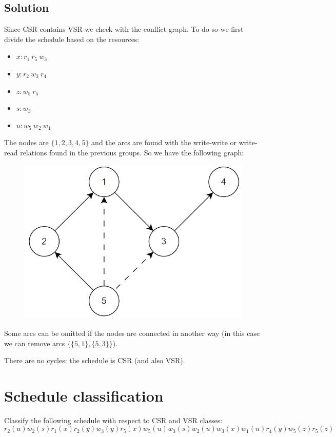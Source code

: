 \documentclass[12pt, a4paper]{report}
\newtheorem[style=M,bodystyle=\normalfont]{theorem}{Theorem}
\newtheorem[style=M,bodystyle=\normalfont]{corollary}{Corollary}
\newtheorem[style=M,bodystyle=\normalfont]{lemma}{Lemma}
\newtheorem[style=M,bodystyle=\normalfont]{definition}{Definition}
\begin{document}
    \subsection*{Solution}
        Since CSR contains VSR we check with the conflict graph. To do so we first divide the schedule based on the resources: 
        \begin{itemize}
            \item $x: r_1 \: r_5 \:w_3$
            \item $y: r_2 \: w_3 \:r_4$
            \item $z: w_5 \: r_5$
            \item $s: w_3$
            \item $u: w_5 \: w_2 \:w_1$
        \end{itemize}
        The nodes are $\{1,2,3,4,5\}$ and the arcs are found with the write-write or write-read relations found in the previous groups. 
        So we have the following graph:
        \begin{figure}[H]
            \centering
            \includegraphics[width=0.5\linewidth]{images/conflictgraph.png}
        \end{figure}
        Some arcs can be omitted if the nodes are connected in another way (in this case we can remove arcs $\{\{5,1\},\{5,3\}\}$). 

        There are no cycles: the schedule is CSR (and also VSR). 

    \newpage
    
    \section{Schedule classification}
        Classify the following schedule with respect to CSR and VSR classes:  
        \[r_2(u) w_2(s) r_1(x) r_2(y) w_3(y) r_5(x) w_5(u) w_3(s)w_2(u) w_3(x) w_1(u) r_4(y) w_5(z) r_5(z)\]
\end{document}
